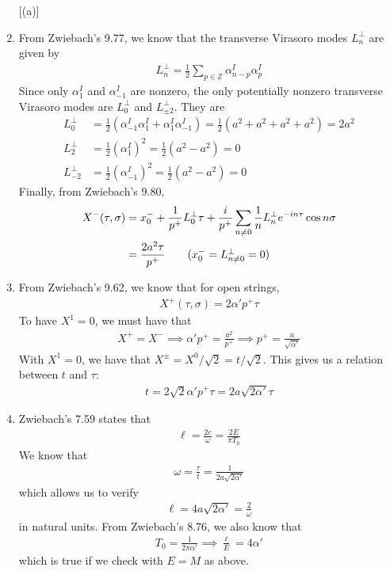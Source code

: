 \documentclass[11pt]{article}
\newcommand{\Z}{\mathbb{Z}}
\begin{document}
\begin{enumerate} [(a)]
    \item From Zwiebach's 9.77, we know that the transverse Virasoro modes $L_n^\perp$ are given by 
    \begin{align*}
        L_n^\perp = \frac{1}{2}\sum_{p \in \Z} \alpha_{n-p}^I \alpha_{p}^I 
    \end{align*}
    Since only $\alpha_1^I$ and $\alpha_{-1}^I$ are nonzero, the only potentially nonzero transverse Virasoro modes are $L_0^\perp$ and $L_{\pm 2}^\perp$. They are 
    \begin{align*}
        L_0^\perp &= \frac{1}{2} (\alpha_{-1}^I \alpha_1^I + \alpha_1^I \alpha_{-1}^I) = \frac{1}{2}(a^2 + a^2 + a^2 + a^2) = 2a^2 \\
        L_2^\perp &= \frac{1}{2} (\alpha^I_1)^2 = \frac{1}{2} (a^2 - a^2) = 0 \\
        L_{-2}^\perp &= \frac{1}{2}(\alpha_{-1}^I)^2 = \frac{1}{2} (a^2 -a^2) = 0 
    \end{align*}
    Finally, from Zwiebach's 9.80,
    \begin{align*}
        X^{-}(\tau, \sigma) &= x^-_0 + \frac{1}{p^+} L_0^\perp \tau + \frac{i}{p^+} \sum_{n \neq 0} \frac{1}{n} L_n^\perp e^{-in\tau} \cos n\sigma \\
        &= \frac{2a^2 \tau}{p^+} \tag{$x^-_0 = L_{n\neq 0}^\perp = 0$} 
    \end{align*}

    \item From Zwiebach's 9.62, we know that for open strings, 
    \begin{align*}
        X^+(\tau, \sigma) = 2\alpha' p^+ \tau 
    \end{align*}
    To have $X^1 = 0$, we must have that 
    \begin{align*}
        X^+ = X^- \implies \alpha' p^+ =  \frac{a^2}{p^+} \implies p^+ = \frac{a}{\sqrt{\alpha'}}
    \end{align*}
    With $X^1 = 0$, we have that $X^{\pm} = X^0/\sqrt{2} = t/\sqrt{2}$. This gives us a relation between $t$ and $\tau$:
    \begin{align*}
        t = 2\sqrt{2} \alpha' p^+ \tau = 2a\sqrt{2\alpha'} \tau 
    \end{align*}

    \item Zwiebach's 7.59 states that 
    \begin{align*}
        \ell = \frac{2c}{\omega } = \frac{2E}{\pi T_0}
    \end{align*}
    We know that 
    \begin{align*}
        \omega = \frac{\tau}{t} = \frac{1}{2a \sqrt{2\alpha'}}
    \end{align*}
    which allows us to verify 
    \begin{align*}
        \ell = 4a \sqrt{2\alpha'} = \frac{2}{\omega} 
    \end{align*}
    in natural units. From Zwiebach's 8.76, we also know that 
    \begin{align*}
        T_0 = \frac{1}{2\pi \alpha' } \implies \frac{\ell}{E} = 4\alpha' 
    \end{align*}
    which is true if we check with $E = M$ as above. 
\end{enumerate}
\end{document}
